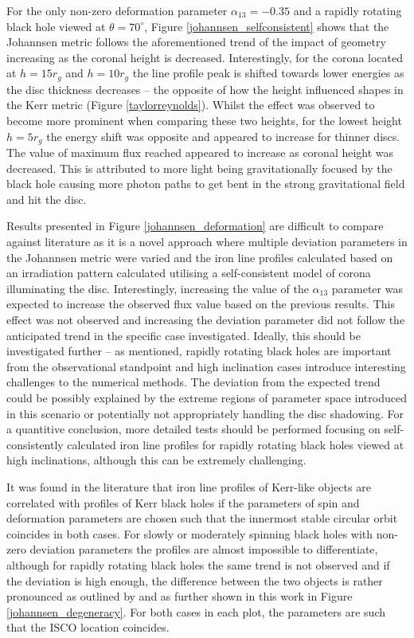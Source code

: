 \documentclass[fleqn,usenatbib,useAMS]{mnras}
\begin{document}
For the only non-zero deformation parameter $\alpha_{13} = -0.35$ and a rapidly rotating black hole viewed at $\theta = 70^{\circ}$, Figure \ref{johannsen_selfconsistent} shows that the Johannsen metric follows the aforementioned trend of the impact of geometry increasing as the coronal height is decreased. Interestingly, for the corona located at $h = 15 r_{g}$ and $h = 10 r_{g}$ the line profile peak is shifted towards lower energies as the disc thickness decreases – the opposite of how the height influenced shapes in the Kerr metric (Figure \ref{taylorreynolds}). Whilst the effect was observed to become more prominent when comparing these two heights, for the lowest height $h = 5 r_{g}$ the energy shift was opposite and appeared to increase for thinner discs. The value of maximum flux reached appeared to increase as coronal height was decreased. This is attributed to more light being gravitationally focused by the black hole causing more photon paths to get bent in the strong gravitational field and hit the disc.

Results presented in Figure \ref{johannsen_deformation} are difficult to compare against literature as it is a novel approach where multiple deviation parameters in the Johannsen metric were varied and the iron line profiles calculated based on an irradiation pattern calculated utilising a self-consistent model of corona illuminating the disc.
Interestingly, increasing the value of the $\alpha_{13}$ parameter was expected to increase the observed flux value based on the previous results. This effect was not observed and increasing the deviation parameter did not follow the anticipated trend in the specific case investigated. Ideally, this should be investigated further -- as mentioned, rapidly rotating black holes are important from the observational standpoint and high inclination cases introduce interesting challenges to the numerical methods. The deviation from the expected trend could be possibly explained by the extreme regions of parameter space introduced in this scenario or potentially not appropriately handling the disc shadowing. For a quantitive conclusion, more detailed tests should be performed focusing on self-consistently calculated iron line profiles for rapidly rotating black holes viewed at high inclinations, although this can be extremely challenging.


It was found in the literature that iron line profiles of Kerr-like objects are correlated with profiles of Kerr black holes if the parameters of spin and deformation parameters are chosen such that the innermost stable circular orbit coincides in both cases. For slowly or moderately spinning black holes with non-zero deviation parameters the profiles are almost impossible to differentiate, although for rapidly rotating black holes the same trend is not observed and if the deviation is high enough, the difference between the two objects is rather pronounced as outlined by \cite{johannsen2014x} and as further shown in this work in Figure \ref{johannsen_degeneracy}. For both cases in each plot, the parameters are such that the ISCO location coincides.
\end{document}
